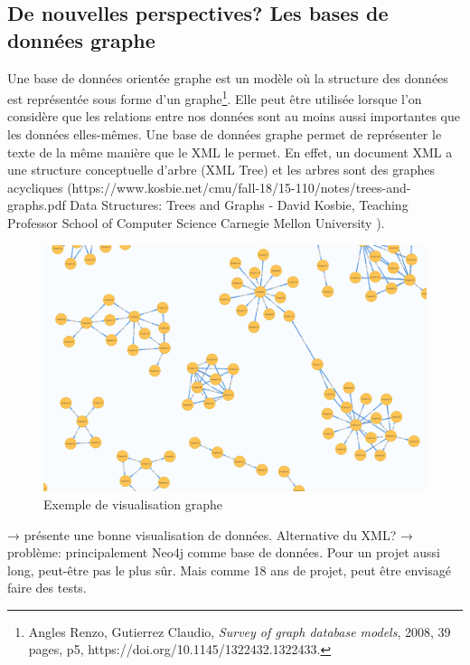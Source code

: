     
    \subsection{De nouvelles perspectives? Les bases de données graphe}

Une base de données orientée graphe est un modèle où la structure des données est représentée sous forme d’un graphe\footnote{Angles Renzo, Gutierrez Claudio, \textit{Survey of graph database models}, 2008, 39 pages, p5, https://doi.org/10.1145/1322432.1322433.}. Elle peut être utilisée lorsque l’on considère que les relations entre nos données sont au moins aussi importantes que les données elles-mêmes. Une base de données graphe permet de représenter le texte de la même manière que le XML le permet. En effet, un document XML a une structure conceptuelle d’arbre (XML Tree) et les arbres sont des graphes acycliques (https://www.kosbie.net/cmu/fall-18/15-110/notes/trees-and-graphs.pdf Data Structures:  Trees and Graphs - David Kosbie, Teaching Professor School of Computer Science Carnegie Mellon University ). 


\begin{figure}[H]
    \centering
    \includegraphics[width=14cm]{images/RI_graph.png}
    \caption{Exemple de visualisation graphe}
    \label{fig:schemadonneessauvegarde}
\end{figure}

→ présente une bonne visualisation de données. Alternative du XML?
→ problème: principalement  Neo4j comme base de données. Pour un projet aussi long, peut-être pas le plus sûr. Mais comme 18 ans de projet, peut être envisagé faire des tests.


